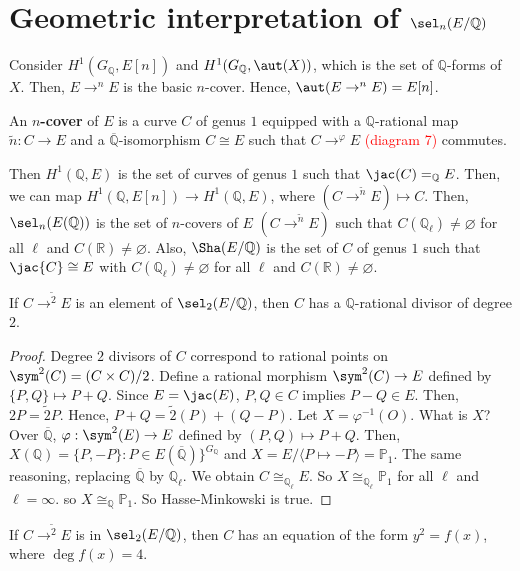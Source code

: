 \section{Geometric interpretation of $\sel_{n}(E/\mathbb{Q})$}

Consider $H^{1}(G_{\mathbb{Q}},E[n])$ and $H^{1}(G_{\mathbb{Q}},\aut(X))$, which is the set of $\mathbb{Q}$-forms of $X$.  Then, $E \to^{n} E$ is the basic $n$-cover.  Hence, $\aut(E \to^{n} E)=E[n]$.
\begin{definition}
An \textbf{$n$-cover} of $E$ is a curve $C$ of genus $1$ equipped with a $\mathbb{Q}$-rational map $\tilde{n}:C \to E$ and a $\overline{\mathbb{Q}}$-isomorphism $C \cong E$ such that $C \to^{\varphi} E$ \textcolor{red}{(diagram 7)} commutes.
\end{definition}
Then $H^{1}(\mathbb{Q},E)$ is the set of curves of genus $1$ such that $\jac(C)=_{\mathbb{Q}}E$.  Then, we can map $H^{1}(\mathbb{Q},E[n]) \to H^{1}(\mathbb{Q},E)$, where $(C \to^{\tilde{n}} E) \mapsto C$.  Then, $\sel_{n}(E(\mathbb{Q}))$ is the set of $n$-covers of $E$ \quad $(C \to^{\tilde{n}} E)$ such that $C(\mathbb{Q}_{\ell}) \ne \varnothing$ for all $\ell$ and $C(\mathbb{R}) \ne \varnothing$.  Also, $\Sha(E/\mathbb{Q})$ is the set of $C$ of genus $1$ such that $\jac{C} \cong E$ with $C(\mathbb{Q}_{\ell}) \ne \varnothing$ for all $\ell$ and $C(\mathbb{R}) \ne \varnothing$.
\begin{theorem}
If $C \to^{\tilde{2}} E$ is an element of $\sel_{2}(E/\mathbb{Q})$, then $C$ has a $\mathbb{Q}$-rational divisor of degree $2$.
\end{theorem}
\begin{proof}
Degree $2$ divisors of $C$ correspond to rational points on $\sym^{2}(C)=(C \times C)/2$.  Define a rational morphism $\sym^{2}(C) \to E$ defined by $\{P,Q\} \mapsto P+Q$.  Since $E=\jac(E)$, $P,Q \in C$ implies $P-Q \in E$.  Then, $2P=\tilde{2}P$.  Hence, $P+Q=\tilde{2}(P)+(Q-P)$.  Let $X=\varphi^{-1}(O)$.  What is $X$?  Over $\overline{\mathbb{Q}}$, $\varphi:\sym^{2}(E) \to E$ defined by $(P,Q) \mapsto P+Q$.  Then, $X(\mathbb{Q})=\{P,-P\}:P \in E(\overline{\mathbb{Q}})\}^{G_{\mathbb{Q}}}$ and $X=E/\langle P \mapsto -P\rangle=\mathbb{P}_{1}$.  The same reasoning, replacing $\overline{\mathbb{Q}}$ by $\mathbb{Q}_{\ell}$.  We obtain $C \cong_{\mathbb{Q}_{\ell}} E$.  So $X \cong_{\mathbb{Q}_{\ell}} \mathbb{P}_{1}$ for all $\ell$ and $\ell=\infty$.  so $X \cong_{\mathbb{Q}} \mathbb{P}_{1}$.  So Hasse-Minkowski is true.
\end{proof}
\begin{corollary}
If $C \to^{\tilde{2}} E$ is in $\sel_{2}(E/\mathbb{Q})$, then $C$ has an equation of the form $y^{2}=f(x)$, where $\deg f(x)=4$.
\end{corollary}
